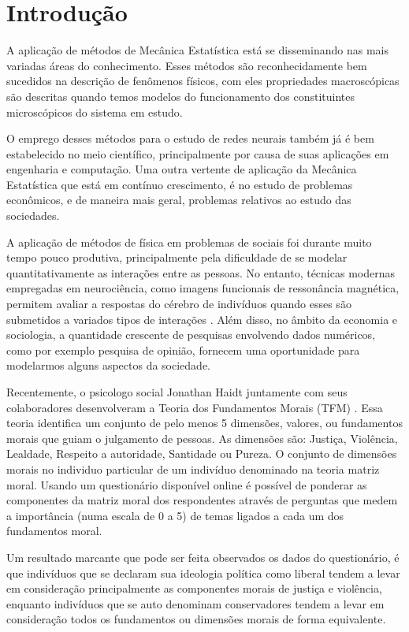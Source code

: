 \chapter*{Introdução}


A aplicação de métodos de Mecânica Estatística está se disseminando nas mais
variadas áreas do conhecimento. Esses métodos são reconhecidamente bem
sucedidos na descrição de fenômenos físicos, com eles propriedades
macroscópicas são descritas quando temos modelos do funcionamento dos
constituintes microscópicos do sistema em estudo.

O emprego desses métodos para o estudo de redes neurais também já é bem
estabelecido no meio científico, principalmente por causa de suas aplicações em
engenharia e computação. Uma outra vertente de aplicação da Mecânica
Estatística que está em contínuo crescimento, é no estudo de problemas
econômicos, e de maneira mais geral, problemas relativos ao estudo das
sociedades.

A aplicação de métodos de física em problemas de sociais foi durante muito
tempo pouco produtiva, principalmente pela dificuldade de se modelar
quantitativamente as interações entre as pessoas. No entanto, técnicas modernas
empregadas em neurociência, como imagens funcionais de ressonância magnética,
permitem avaliar a respostas do cérebro de indivíduos quando esses são
submetidos a variados tipos de interações \citep{Fowler2008}. Além disso, no
âmbito da economia e sociologia, a quantidade crescente de pesquisas envolvendo
dados numéricos, como por exemplo pesquisa de opinião, fornecem uma
oportunidade para modelarmos alguns aspectos da sociedade.

Recentemente, o psicologo social Jonathan Haidt juntamente com seus
colaboradores desenvolveram a Teoria dos Fundamentos Morais (TFM)
\citep{Haidt2007}. Essa teoria identifica um conjunto de pelo menos 5 dimensões,
valores, ou fundamentos morais que guiam o julgamento de pessoas. As dimensões
são: Justiça, Violência, Lealdade, Respeito a autoridade, Santidade ou Pureza.
O conjunto de dimensões morais no individuo particular de um indivíduo
denominado na teoria matriz moral. Usando um questionário disponível online
\citep{Quest} é possível de ponderar as componentes da matriz moral dos
respondentes através de perguntas que medem a importância (numa escala de 0 a
5) de temas ligados a cada um dos fundamentos moral.
 
Um resultado  marcante que pode ser feita observados os dados do
questionário, é que indivíduos que se declaram sua ideologia política como
liberal tendem a levar em consideração principalmente as componentes morais de
justiça e violência, enquanto indivíduos que se auto denominam conservadores
tendem a levar em consideração todos os fundamentos ou dimensões morais de forma
equivalente.

